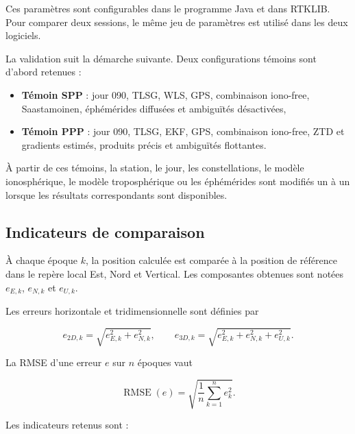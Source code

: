 Ces paramètres sont configurables dans le programme Java et dans RTKLIB. Pour
comparer deux sessions, le même jeu de paramètres est utilisé dans les deux
logiciels.



La validation suit la démarche suivante. Deux configurations témoins
sont d'abord retenues :

\begin{itemize}
    \item \textbf{Témoin SPP} : jour 090, TLSG, WLS, GPS, combinaison iono-free,
    Saastamoinen, éphémérides diffusées et ambiguïtés désactivées,
    \item \textbf{Témoin PPP} : jour 090, TLSG, EKF, GPS, combinaison iono-free,
    ZTD et gradients estimés, produits précis et ambiguïtés flottantes.
\end{itemize}

À partir de ces témoins, la station, le jour, les constellations, le modèle
ionosphérique, le modèle troposphérique ou les éphémérides sont modifiés un à
un lorsque les résultats correspondants sont disponibles.

\subsection{Indicateurs de comparaison}
\label{sec:validation_indicators}

À chaque époque $k$, la position calculée est comparée à la position de
référence dans le repère local Est, Nord et Vertical. Les composantes obtenues
sont notées $e_{E,k}$, $e_{N,k}$ et $e_{U,k}$.

Les erreurs horizontale et tridimensionnelle sont définies par

\begin{equation}
e_{2D,k}=\sqrt{e_{E,k}^{2}+e_{N,k}^{2}},
\qquad
e_{3D,k}=\sqrt{e_{E,k}^{2}+e_{N,k}^{2}+e_{U,k}^{2}}.
\label{eq:validation_errors}
\end{equation}

La RMSE d'une erreur $e$ sur $n$ époques vaut

\begin{equation}
\operatorname{RMSE}(e)=
\sqrt{\frac{1}{n}\sum_{k=1}^{n}e_k^2}.
\label{eq:validation_rmse}
\end{equation}

Les indicateurs retenus sont :


